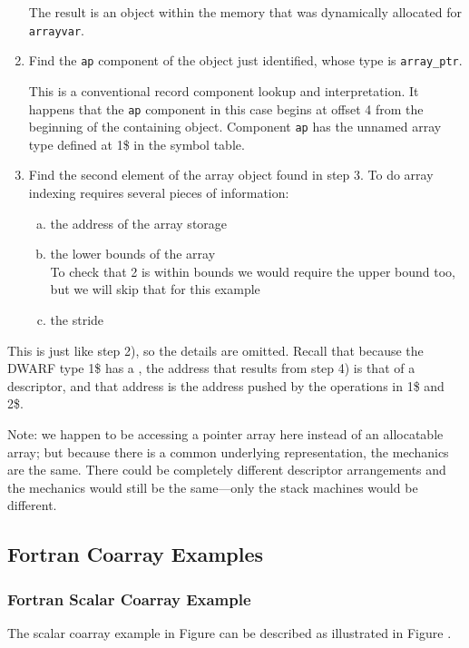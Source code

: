 \begin{enumerate}[1. ]
The result is an object within the memory that was dynamically
allocated for \texttt{arrayvar}.

\item  Find the \texttt{ap} component of the object just identified,
whose type is \texttt{array\_ptr}.

This is a conventional record component lookup and
interpretation. It happens that the \texttt{ap} component in this case
begins at offset 4 from the beginning of the containing object.
Component \texttt{ap} has the unnamed array type defined at 1\$ in the
symbol table.

\item  Find the second element of the array object found in step 3. 
To do array indexing requires
several pieces of information:
\begin{enumerate}[a) ]
\item  the address of the array storage

\item  the lower bounds of the array \\
\lbrack To check that 2 is within bounds we would require the upper
bound too, but we will skip that for this example \rbrack

\item  the stride

\end{enumerate}
\end{enumerate}

This is just like step 2), so the details are omitted. Recall
that because the DWARF type 1\$ has a \DWATdatalocation,
the address that results from step 4) is that of a
descriptor, and that address is the address pushed by the
\DWOPpushobjectaddress{} operations in 1\$ and 2\$.

Note: we happen to be accessing a pointer array here instead
of an allocatable array; but because there is a common
underlying representation, the mechanics are the same. There
could be completely different descriptor arrangements and the
mechanics would still be the same---only the stack machines
would be different.

\subsection{Fortran Coarray Examples}
\label{app:Fortrancoarrayexamples}

\subsubsection{Fortran Scalar Coarray Example}
The  scalar coarray example
in Figure  can be described as 
illustrated in Figure .

